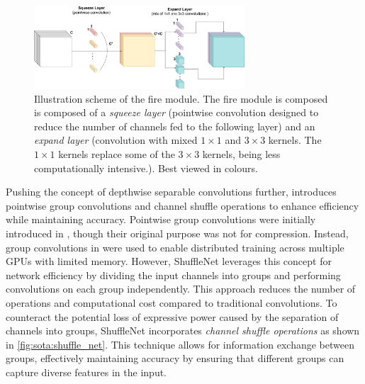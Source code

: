 \begin{figure}[htbp]
    \centering
    \includegraphics[width=0.70\textwidth]{chapter_sota/assets/fire_module.pdf}
    \caption{Illustration scheme of the fire module. The fire module is composed
    is composed of a \emph{squeeze layer} (pointwise convolution designed to
    reduce the number of channels fed to the following layer) and an
    \emph{expand layer} (convolution with mixed $1\times1$ and $3\times3$
    kernels. The $1\times1$ kernels replace some of the $3\times3$ kernels,
    being less computationally intensive.). Best viewed in colours.}
    \label{fig:sota:fire_module}
\end{figure}



Pushing the concept of depthwise separable convolutions further,
\cite{ZhangShuffleNet} introduces pointwise group convolutions and channel
shuffle operations to enhance efficiency while maintaining accuracy. Pointwise
group convolutions were initially introduced in
\cite{DBLP:conf/nips/KrizhevskySH12}, though their original purpose was not for
compression. Instead, group convolutions in \cite{DBLP:conf/nips/KrizhevskySH12}
were used to enable distributed training across multiple \acp{GPU} with limited
memory. However, ShuffleNet \cite{ZhangShuffleNet} leverages this concept for
network efficiency by dividing the input channels into groups and performing
convolutions on each group independently. This approach reduces the number of
operations and computational cost compared to traditional convolutions. To
counteract the potential loss of expressive power caused by the separation of
channels into groups, ShuffleNet incorporates \emph{channel shuffle operations}
as shown in \cref{fig:sota:shuffle_net}. This technique allows for information
exchange between groups, effectively maintaining accuracy by ensuring that
different groups can capture diverse features in the input.\\

